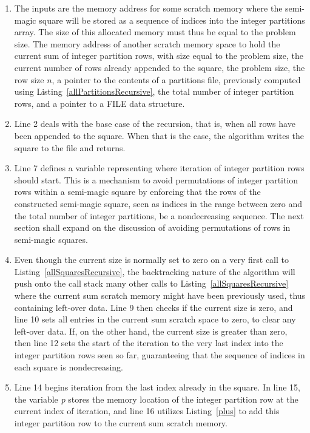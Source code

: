 \begin{enumerate}
\item The inputs are the memory address for some scratch memory where the semi-magic square will be stored as a sequence of indices into the integer partitions array. The size of this allocated memory must thus be equal to the problem size. The memory address of another scratch memory space to hold the current sum of integer partition rows, with size equal to the problem size, the current number of rows already appended to the square, the problem size, the row size $n$, a pointer to the contents of a partitions file, previously computed using Listing~\ref{allPartitionsRecursive}, the total number of integer partition rows, and a pointer to a FILE data structure.
\item Line 2 deals with the base case of the recursion, that is, when all rows have been appended to the square. When that is the case, the algorithm writes the square to the file and returns.
\addtocounter{enumi}{4}
\item Line 7 defines a variable representing where iteration of integer partition rows should start. This is a mechanism to avoid permutations of integer partition rows within a semi-magic square by enforcing that the rows of the constructed semi-magic square, seen as indices in the range between zero and the total number of integer partitions, be a nondecreasing sequence. The next section shall expand on the discussion of avoiding permutations of rows in semi-magic squares.
\addtocounter{enumi}{1}
\item Even though the current size is normally set to zero on a very first call to Listing~\ref{allSquaresRecursive}, the backtracking nature of the algorithm will push onto the call stack many other calls to Listing~\ref{allSquaresRecursive} where the current sum scratch memory might have been previously used, thus containing left-over data. Line 9 then checks if the current size is zero, and line 10 sets all entries in the current sum scratch space to zero, to clear any left-over data. If, on the other hand, the current size is greater than zero, then line 12 sets the start of the iteration to the very last index into the integer partition rows seen so far, guaranteeing that the sequence of indices in each square is nondecreasing.
\addtocounter{enumi}{4}
\item Line 14 begins iteration from the last index already in the square. In line 15, the variable \emph{p} stores the memory location of the integer partition row at the current index of iteration, and line 16 utilizes Listing~\ref{plus} to add this integer partition row to the current sum scratch memory.

\end{enumerate}
